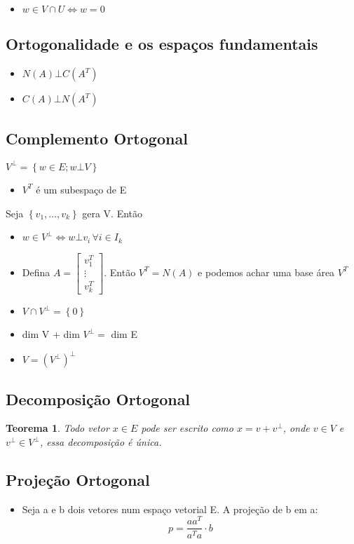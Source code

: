 \documentclass[12pt]{article}
\newtheorem{theorem}{Teorema}
\begin{document}
    \begin{itemize}
        \item $w \in V \cap U \iff w = 0$
    \end{itemize}

\subsection*{Ortogonalidade e os espaços fundamentais}
\begin{itemize}
    \item $N(A) \bot C(A^T)$
    \item $C(A) \bot N(A^T)$
\end{itemize}

\subsection*{Complemento Ortogonal}
$V^\bot = \left\{w \in E ; w \bot V\right\}$
\begin{itemize}
    \item $V^T$ é um subespaço de E
\end{itemize}
Seja $\left\{v_1, \dots, v_k\right\}$ gera V. Então
\begin{itemize}
    \item $w \in V^\bot \iff w \bot v_i \, \forall i \in I_k$
    \item Defina $A = \left[ \begin{array}{cc}
    v_1^T \\
    \vdots \\
    v_k^T \end{array} \right]$. Então $V^T = N(A)$ e podemos achar uma base área $V^T$
    \item $V \cap V^\bot = \left\{0\right\}$
    \item dim V + dim $V^\bot = $ dim E
    \item $V = (V^\bot)^\bot$
\end{itemize}

\subsection*{Decomposição Ortogonal}

\begin{theorem}
Todo vetor $x \in E$ pode ser escrito como $x = v + v^\bot$, onde $v \in V$ e $v^\bot \in V^\bot$, essa decomposição é única.
\end{theorem}

\subsection*{Projeção Ortogonal}
\begin{itemize}
    \item Seja a e b dois vetores num espaço vetorial E. A projeção de b em a:
    $$p = \dfrac{a a^T}{a^T a} \cdot b$$
\end{itemize}
\end{document}
